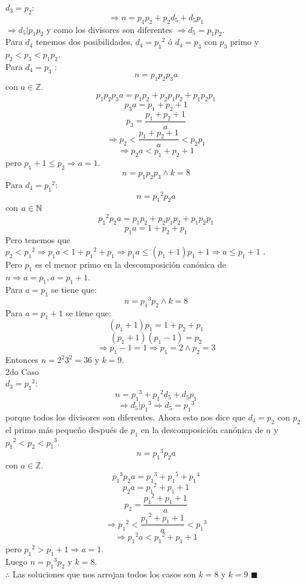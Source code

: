 \documentclass{book}
\newcommand{\Z}{\mathbb{Z}} \def\max{\mathop{\mbox{\rm máx}}} %
\begin{document}
\begin{enumerate}
          $d_3=p_2$:
          $$\Rightarrow n=p_1 p_2+p_2 d_5+d_5 p_1$$
          $\Rightarrow d_5|p_1 p_2$ y como los divisores son diferentes $\Rightarrow d_5=p_1 p_2$.\\
          Para $d_4$  tenemos dos posibilidades, $d_4={p_1}^2$ ó $d_4= p_3$ con $p_3$ primo y $p_2<p_3<p_1 p_2$.\\
          Para $d_4=p_3$ :\\
          $$n=p_ 1 p_2 p_3 a$$ con $a\in\Z$.
          $$p_1 p_2 p_3 a=p_1 p_2+p_2 p_1 p_2+p_1 p_2 p_1$$
          $$p_3 a=p_1+p_2+1$$
          $$p_3=\frac{p_1+p_2+1}{a}$$
          $$\Rightarrow p_2<\frac{p_1+p_2+1}{a}<p_2 p_1$$
          $$\Rightarrow p_2 a<p_1+p_2+1$$
          pero $p_1+1\leq p_2 \Rightarrow a=1$.
          $$n=p_1 p_ 2 p_ 3  \wedge k=8$$
          Para $d_4={p_1}^2$:
          $$n={p_ 1}^2 p_2 a$$ con $a\in\mathbb{N}$
          $${p_ 1}^2 p_ 2 a=p_1 p_2+p_2 p_1 p_2+p_1 p_2 p_1$$
          $$p_ 1 a=1+p_2+p_1$$
          Pero tenemos que $p_2<{p_ 1}^2\Rightarrow p_1 a<1+{p_ 1}^2+p_1\Rightarrow p_1 a\leq(p_1 +1) p_1 +1\Rightarrow a\leq p_1+1$ .\\
          Pero $p_1 $ es el menor primo en la descomposición canónica de $n\Rightarrow a= p_1,a= p_1+1$.\\
          Para $a= p_1$ se tiene que:
          $$n={p_ 1}^3 p_2  \wedge k=8$$
          Para $a= p_1 +1$ se tiene que:
          $$(p_1+1) p_1 =1+p_2+p_1$$
          $$(p_1 +1)(p_1 -1)=p_2$$
          $$\Rightarrow p_1-1=1 \Rightarrow p_1 =2 \wedge p_2 =3$$
          Entonces $n=2^2 3^2=36$ y $k=9$.\\
          2do Caso\\
          $d_3={p_1}^2$:
          $$n={p_1}^3+{p_1}^2 d_5+d_5 p_1$$
          $$\Rightarrow d_5|{p_1}^3   \Rightarrow d_5={p_1}^3$$
          porque todos los divisores son diferentes.
          Ahora esto nos dice que $d_4= p_2$ con $p_2$ el primo más pequeño después de $p_1$ en la descomposición canónica de $n$ y ${p_1}^2<p_2<{p_1}^3$.
          $$n={p_1}^3 p_2 a$$
          con $a\in\Z$.
          $${p_1}^3 p_2 a ={p_1}^3+{p_1}^5+{p_1}^4$$
          $$p_2 a ={p_1}^2+p_1+1$$
          $$p_2  =\frac{{p_1}^2+p_1+1}{a}$$
          $$\Rightarrow {p_1}^2<\frac{{p_1}^2+p_1+1}{a}<{p_1}^3$$
          $$\Rightarrow {p_1}^2 a<{p_1}^2+p_1+1$$ pero ${p_1}^2>p_1+1\Rightarrow a=1$.\\
          Luego $n={p_1}^3 p_2$  y $k=8$.\\
          $\therefore$ Las soluciones que nos arrojan todos los casos son $k=8$ y $k=9$ $\blacksquare$\\

\end{enumerate}
\end{document}
